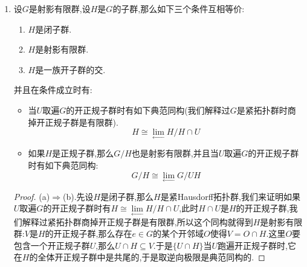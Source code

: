 \begin{enumerate}
\begin{proof}
    	\qquad
    	
    	下面证明$e$的每个开邻域都包含了$e$的一个紧致的开邻域$W$.设$e$的所有紧致的开邻域构成的集合为$\mathscr{U}$,那么$C_e=\cap_{K\in\mathscr{U}}K$,按照$G$是全不连通的,有$C_e=\{e\}$.再设$U$是$e$的任意开邻域,那么$G-U$是闭的,于是由于$G$紧得到$G-U$紧.从$C_e=\{e\}$得到$\{K^c,K\in\mathscr{U}\}$是$G-U$的开覆盖,所以可取有限子覆盖,于是有有限个$e$的紧致开邻域$K_1,\cdots,K_r$满足$K=\cap_{j=1}^rK_j\subseteq U$,这就找到了紧致开邻域$K$.
    	
    	\qquad
    	
    	我们再证明$e$的紧致开邻域$W$包含了$e$的一个对称开邻域$V$,使得$WV\subseteq W$.考虑群的二元运算的限制映射$\mu:W\times W\to G$,这是连续的,因为$\mu(w,e)\in W,\forall w\in W$,所以可找$w\in W$的开邻域$U_w\subseteq W$以及$e$的对称开邻域$V_w\subseteq W$,使得$U_w\times V_w\subseteq\mu^{-1}(W)$.那么$\{U_w,w\in W\}$构成了$W$的开覆盖,可取有限子覆盖$\{U_1,\cdots,U_r\}$,设对应的$V$是$\{V_1,\cdots,V_r\}$.取$V=\cap_{j=1}^rV_j$,按照构造有$WV\subseteq W$,并且有$V^n\subseteq W,\forall n\ge0$.
    	
    	\qquad
    	
    	最后我们取$O=\cup_{n\ge1}V^n$,这是一个开子群.按照$G$是紧的,有$G/O$是有限离散空间.于是可设全部左陪集代表元$x_1,\cdots,x_s$,于是$O$在$G$中的共轭只有有限个$\{x_jOx_j^{-1},j=1,\cdots,s\}$.取$N=\cap_{j=1}^sx_jOx_j^{-1}$是$G$的开正规子群,并且$N\subseteq O\subseteq W\subseteq U$.得证.
    \end{proof}
	\item 设$G$是射影有限群,设$H$是$G$的子群,那么如下三个条件互相等价:
	\begin{enumerate}
		\item $H$是闭子群.
		\item $H$是射影有限群.
		\item $H$是一族开子群的交.
	\end{enumerate}
	
	并且在条件成立时有:
	\begin{itemize}
		\item 当$U$取遍$G$的开正规子群时有如下典范同构(我们解释过$G$是紧拓扑群时商掉开正规子群是有限群).
		$$H\cong\lim\limits_{\leftarrow}H/H\cap U$$
		\item 如果$H$是正规子群,那么$G/H$也是射影有限群,并且当$U$取遍$G$的开正规子群时有如下典范同构:
		$$G/H\cong\lim\limits_{\leftarrow}G/UH$$
	\end{itemize}
	\begin{proof}
		
		(a)$\Rightarrow$(b).先设$H$是闭子群,那么$H$是紧Hausdorff拓扑群,我们来证明如果$U$取遍$G$的开正规子群时有$H\cong\lim\limits_{\leftarrow}H/H\cap U$,此时$H\cap U$是$H$的开正规子群,我们解释过紧拓扑群商掉开正规子群是有限群,所以这个同构就得到$H$是射影有限群:$V$是$H$的开正规子群,那么存在$e\in G$的某个开邻域$O$使得$V=O\cap H$.这里$O$要包含一个开正规子群$U$,那么$U\cap H\subseteq V$.于是$\{U\cap H\}$当$U$跑遍开正规子群时,它在$H$的全体开正规子群中是共尾的,于是取逆向极限是典范同构的.
		

\end{proof}
\end{enumerate}
